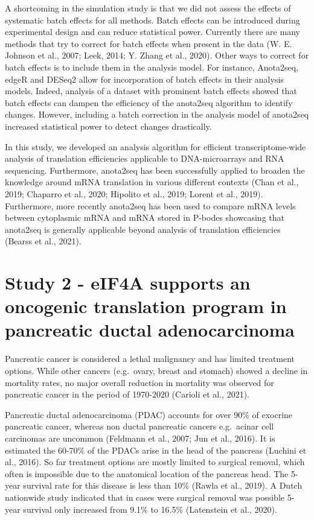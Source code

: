 \documentclass[12pt,openany]{book}
\begin{document}
A shortcoming in the simulation study is that we did not assess the
effects of systematic batch effects for all methods. Batch effects can
be introduced during experimental design and can reduce statistical
power. Currently there are many methods that try to correct for batch
effects when present in the data (W. E. Johnson et al., 2007; Leek,
2014; Y. Zhang et al., 2020). Other ways to correct for batch effects is
to include them in the analysis model. For instance, Anota2seq, edgeR
and DESeq2 allow for incorporation of batch effects in their analysis
models. Indeed, analysis of a dataset with prominent batch effects
showed that batch effects can dampen the efficiency of the anota2seq
algorithm to identify changes. However, including a batch correction in
the analysis model of anota2seq increased statistical power to detect
changes drastically.

In this study, we developed an analysis algorithm for efficient
transcriptome-wide analysis of translation efficiencies applicable to
DNA-microarrays and RNA sequencing. Furthermore, anota2seq has been
successfully applied to broaden the knowledge around mRNA translation in
various different contexts (Chan et al., 2019; Chaparro et al., 2020;
Hipolito et al., 2019; Lorent et al., 2019). Furthermore, more recently
anota2seq has been used to compare mRNA levels between cytoplasmic mRNA
and mRNA stored in P-bodes showcasing that anota2seq is generally
applicable beyond analysis of translation efficiencies (Bearss et al.,
2021). \newline
\section{Study 2 - eIF4A supports an oncogenic translation program in pancreatic ductal adenocarcinoma}

Pancreatic cancer is considered a lethal malignancy and has limited
treatment options. While other cancers (e.g.~ovary, breast and stomach)
showed a decline in mortality rates, no major overall reduction in
mortality was observed for pancreatic cancer in the period of 1970-2020
(Carioli et al., 2021).

Pancreatic ductal adenocarcinoma (PDAC) accounts for over 90\% of
exocrine pancreatic cancer, whereas non ductal pancreatic cancers
e.g.~acinar cell carcinomas are uncommon (Feldmann et al., 2007; Jun et
al., 2016). It is estimated the 60-70\% of the PDACs arise in the head
of the pancreas (Luchini et al., 2016). So far treatment options are
mostly limited to surgical removal, which often is impossible due to the
anatomical location of the pancreas head. The 5-year survival rate for
this disease is less than 10\% (Rawla et al., 2019). A Dutch nationwide
study indicated that in cases were surgical removal was possible 5-year
survival only increased from 9.1\% to 16.5\% (Latenstein et al., 2020).
\end{document}
